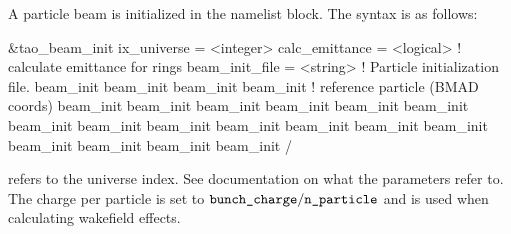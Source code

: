 {{{{A particle beam is initialized in the  namelist block.
The syntax is as follows:
\begin{example}
  &tao_beam_init
    ix_universe             = <integer>
    calc_emittance          = <logical>   ! calculate emittance for rings
    beam_init_file          = <string>    ! Particle initialization file.
    beam_init%
    beam_init%
    beam_init%
    beam_init%
                                          ! reference particle (BMAD coords)
    beam_init%
    beam_init%
    beam_init%
    beam_init%
    beam_init%
    beam_init%
    beam_init%
    beam_init%
    beam_init%
    beam_init%
    beam_init%
    beam_init%
    beam_init%
    beam_init%
    beam_init%
    beam_init%
    beam_init%
  /
\end{example}
 refers to the universe index. See \bmad documentation on what
the  parameters refer to. The charge per particle is set to
$\vn{bunch_charge} / \vn{n_particle}$ and is used when calculating wakefield
effects.

}}}}
